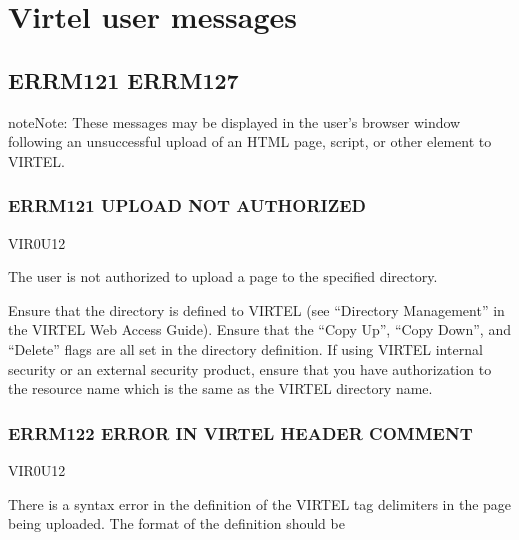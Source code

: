 \documentclass[letterpaper,10pt,english]{sphinxmanual}
\begin{document}
\section{Virtel user messages}
\label{\detokenize{messages:virtel-user-messages}}

\subsection{ERRM121 \sphinxhyphen{} ERRM127}
\label{\detokenize{messages:errm121-errm127}}
\begin{sphinxadmonition}{note}{Note:}
\sphinxAtStartPar
These messages may be displayed in the user’s browser window following an unsuccessful upload of an HTML page, script, or other element to VIRTEL.
\end{sphinxadmonition}


\subsubsection{ERRM121 \sphinxhyphen{}UPLOAD NOT AUTHORIZED}
\label{\detokenize{messages:errm121-upload-not-authorized}}\begin{description}
\sphinxAtStartPar
VIR0U12

\sphinxAtStartPar
The user is not authorized to upload a page to the specified directory.

\sphinxAtStartPar
Ensure that the directory is defined to VIRTEL (see “Directory Management” in the VIRTEL Web Access Guide). Ensure that the “Copy Up”, “Copy Down”, and “Delete” flags are all set in the directory definition. If using VIRTEL internal security or an external security product, ensure that you have authorization to the resource name which is the same as the VIRTEL directory name.

\end{description}


\subsubsection{ERRM122 \sphinxhyphen{} ERROR IN VIRTEL HEADER COMMENT}
\label{\detokenize{messages:errm122-error-in-virtel-header-comment}}\begin{description}
\sphinxAtStartPar
VIR0U12

\sphinxAtStartPar
There is a syntax error in the definition of the VIRTEL tag delimiters in the page being uploaded. The format of the definition should be

\end{description}
\end{document}
